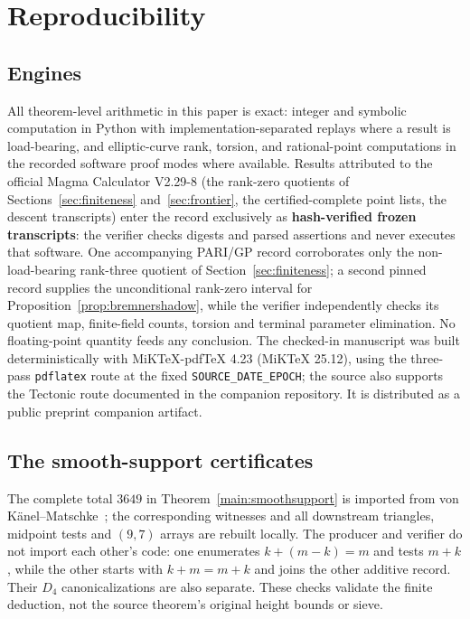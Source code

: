 \section{Reproducibility}\label{app:repro}

\subsection{Engines}

All theorem-level arithmetic in this paper is exact: integer and symbolic
computation in Python with implementation-separated replays where a result
is load-bearing, and elliptic-curve rank, torsion, and rational-point
computations in the recorded software proof modes where available. Results attributed to the official Magma Calculator V2.29-8
(the rank-zero quotients of Sections~\ref{sec:finiteness}
and~\ref{sec:frontier}, the certified-complete point lists, the descent
transcripts) enter the record exclusively as \textbf{hash-verified frozen
transcripts}: the verifier checks digests and parsed assertions and never
executes that software. One accompanying PARI/GP record corroborates only the
non-load-bearing rank-three quotient of Section~\ref{sec:finiteness}; a
second pinned record supplies the unconditional rank-zero interval for
Proposition~\ref{prop:bremnershadow}, while the verifier independently
checks its quotient map, finite-field counts, torsion and terminal parameter
elimination. No
floating-point quantity feeds any conclusion. The checked-in manuscript was
built deterministically with MiKTeX-pdfTeX 4.23 (MiKTeX 25.12), using the
three-pass \texttt{pdflatex} route at the fixed
\texttt{SOURCE\_DATE\_EPOCH}; the source also supports the Tectonic route
documented in the companion repository. It is distributed as a public
preprint companion artifact.

\subsection{The smooth-support certificates}

The complete total $3649$ in Theorem~\ref{main:smoothsupport} is imported
from von K\"anel--Matschke~\cite{VKM16}; the corresponding witnesses and
all downstream triangles, midpoint tests and $(9,7)$ arrays are rebuilt
locally. The producer and verifier do not import each other's code: one
enumerates $k+(m-k)=m$ and tests $m+k$, while the other starts with
$k+m=m+k$ and joins the other additive record. Their $D_4$
canonicalizations are also separate. These checks validate the finite
deduction, not the source theorem's original height bounds or sieve.

